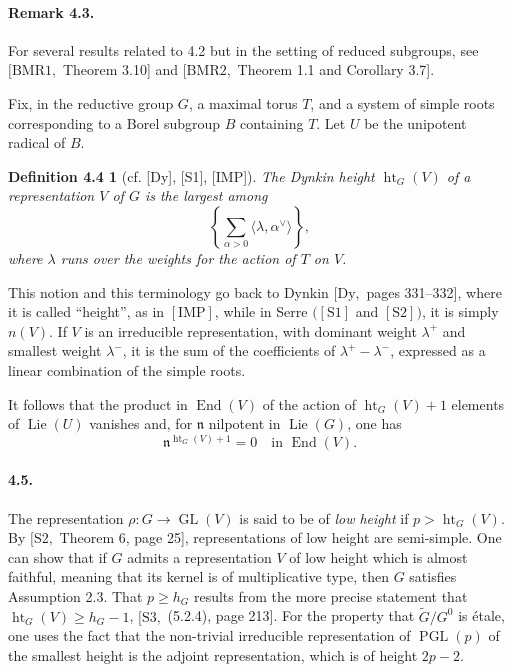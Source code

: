 \documentclass[11pt]{article}
\newcommand{\Lie}{\operatorname{Lie}}
\newcommand{\GL}{\operatorname{GL}}
\newcommand{\htG}{\operatorname{ht}_G}
\newcommand{\PGL}{\operatorname{PGL}}
\newcommand{\End}{\operatorname{End}}
\newtheorem*{definition44}{Definition 4.4}
\begin{document}
\paragraph{Remark 4.3.}
For several results related to 4.2 but in the setting of reduced subgroups, see
\([\mathrm{BMR1},\) Theorem 3.10] and \([\mathrm{BMR2},\) Theorem 1.1 and
Corollary 3.7].

Fix, in the reductive group \(G\), a maximal torus \(T\), and a system of simple
roots corresponding to a Borel subgroup \(B\) containing \(T\). Let \(U\) be the
unipotent radical of \(B\).

\begin{definition44}[{cf. [Dy], [S1], [IMP]}]
The Dynkin height \(\htG(V)\) of a representation \(V\) of \(G\) is the largest
among
\[
  \left\{\sum_{\alpha>0}\langle\lambda,\alpha^\vee\rangle\right\},
\]
where \(\lambda\) runs over the weights for the action of \(T\) on \(V\).
\end{definition44}

This notion and this terminology go back to Dynkin \([\mathrm{Dy},\) pages
331--332], where it is called ``height'', as in \([\mathrm{IMP}]\), while in Serre
\(([\mathrm{S1}]\) and \([\mathrm{S2}])\), it is simply \(n(V)\). If \(V\) is an
irreducible representation, with dominant weight \(\lambda^+\) and smallest weight
\(\lambda^-\), it is the sum of the coefficients of \(\lambda^+-\lambda^-\), expressed
as a linear combination of the simple roots.

It follows that the product in \(\End(V)\) of the action of \(\htG(V)+1\) elements
of \(\Lie(U)\) vanishes and, for \(\mathfrak n\) nilpotent in \(\Lie(G)\), one has
\[
  \mathfrak n^{\htG(V)+1}=0\quad\text{in }\End(V).
\]

\paragraph{4.5.}
The representation \(\rho:G\to\GL(V)\) is said to be of \emph{low height} if
\(p>\htG(V)\). By \([\mathrm{S2},\) Theorem 6, page 25], representations of low
height are semi-simple. One can show that if \(G\) admits a representation \(V\) of
low height which is almost faithful, meaning that its kernel is of multiplicative type,
then \(G\) satisfies Assumption 2.3. That \(p\ge h_G\) results from the more precise
statement that \(\htG(V)\ge h_G-1\), \([\mathrm{S3},\) (5.2.4), page 213]. For the
property that \(\widetilde G/G^0\) is étale, one uses the fact that the non-trivial
irreducible representation of \(\PGL(p)\) of the smallest height is the adjoint
representation, which is of height \(2p-2\).
\end{document}
